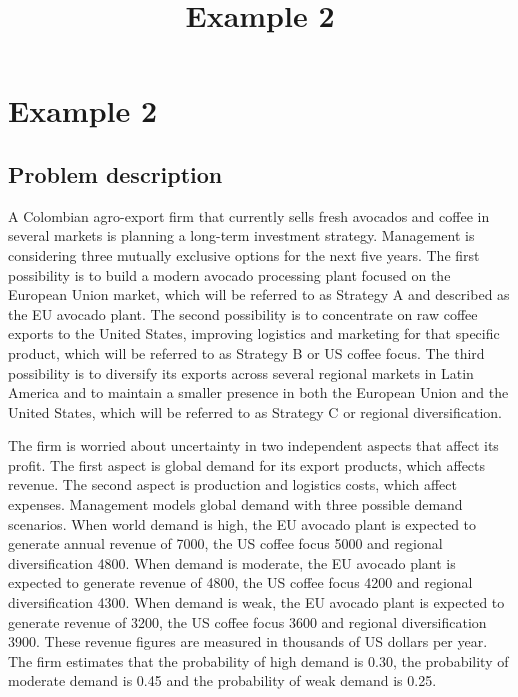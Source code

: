 \documentclass[11pt]{article}
\title{Example 2}
\author{}
\date{}
\begin{document}
	\maketitle
	
	\section{Example 2}\label{sec:example2}
	
	\subsection{Problem description}\label{subsec:example2-problem}
	
	A Colombian agro-export firm that currently sells fresh avocados and coffee in several markets is planning a
	long-term investment strategy. Management is considering three mutually exclusive options for the next five years.
	The first possibility is to build a modern avocado processing plant focused on the European Union market, which will
	be referred to as Strategy A and described as the EU avocado plant. The second possibility is to concentrate on
	raw coffee exports to the United States, improving logistics and marketing for that specific product, which will be
	referred to as Strategy B or US coffee focus. The third possibility is to diversify its exports across several
	regional markets in Latin America and to maintain a smaller presence in both the European Union and the United States,
	which will be referred to as Strategy C or regional diversification.
	
	\medskip
	The firm is worried about uncertainty in two independent aspects that affect its profit. The first aspect is global
	demand for its export products, which affects revenue. The second aspect is production and logistics costs, which
	affect expenses. Management models global demand with three possible demand scenarios. When world demand is high,
	the EU avocado plant is expected to generate annual revenue of 7000, the US coffee focus 5000 and regional
	diversification 4800. When demand is moderate, the EU avocado plant is expected to generate revenue of 4800, the
	US coffee focus 4200 and regional diversification 4300. When demand is weak, the EU avocado plant is expected to
	generate revenue of 3200, the US coffee focus 3600 and regional diversification 3900. These revenue figures are
	measured in thousands of US dollars per year. The firm estimates that the probability of high demand is 0.30, the
	probability of moderate demand is 0.45 and the probability of weak demand is 0.25.
	
\end{document}
